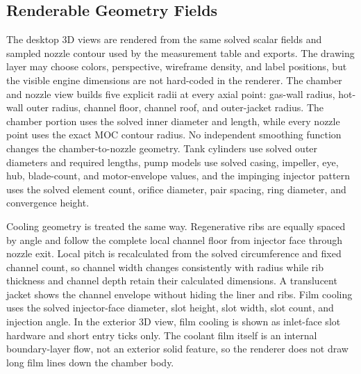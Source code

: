\documentclass[11pt]{article}
\begin{document}
\subsection{Renderable Geometry Fields}
The desktop 3D views are rendered from the same solved scalar fields and sampled nozzle contour used by the measurement table and exports. The drawing layer may choose colors, perspective, wireframe density, and label positions, but the visible engine dimensions are not hard-coded in the renderer. The chamber and nozzle view builds five explicit radii at every axial point: gas-wall radius, hot-wall outer radius, channel floor, channel roof, and outer-jacket radius. The chamber portion uses the solved inner diameter and length, while every nozzle point uses the exact MOC contour radius. No independent smoothing function changes the chamber-to-nozzle geometry. Tank cylinders use solved outer diameters and required lengths, pump models use solved casing, impeller, eye, hub, blade-count, and motor-envelope values, and the impinging injector pattern uses the solved element count, orifice diameter, pair spacing, ring diameter, and convergence height.

Cooling geometry is treated the same way. Regenerative ribs are equally spaced by angle and follow the complete local channel floor from injector face through nozzle exit. Local pitch is recalculated from the solved circumference and fixed channel count, so channel width changes consistently with radius while rib thickness and channel depth retain their calculated dimensions. A translucent jacket shows the channel envelope without hiding the liner and ribs. Film cooling uses the solved injector-face diameter, slot height, slot width, slot count, and injection angle. In the exterior 3D view, film cooling is shown as inlet-face slot hardware and short entry ticks only. The coolant film itself is an internal boundary-layer flow, not an exterior solid feature, so the renderer does not draw long film lines down the chamber body.

\begin{table}[H]
\centering
\caption{Selected solved fields used directly by the live 3D renderer for the default pump-fed impinging-injector case.}
\end{table}
\end{document}
